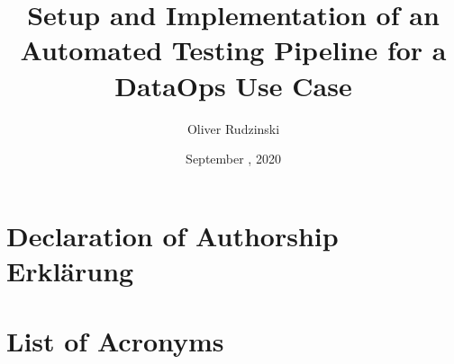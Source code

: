 


\newcommand{\bachelorsthesis}{Setup and Implementation of an\\Automated Testing Pipeline for a\\DataOps Use Case}

\title{\bachelorsthesis} 
\author{Oliver Rudzinski}
\date{September , 2020}



\makeatletter

	
	\pagestyle{plain}
	\clearpage 
	
	\thispagestyle{empty}
	
	\clearpage 
	
	\newpage \clearpage \thispagestyle{empty} \null
	
	\chapter*{Declaration of Authorship\\{\color{gray}Erklärung}}
	
	\thispagestyle{empty}
	
	\clearpage
	
	
	\newpage \clearpage \thispagestyle{empty} \null
	{\small\tableofcontents}
	\newpage \clearpage \thispagestyle{empty} \null
	
	\thispagestyle{empty}
	\chapter*{List of Acronyms} 
	
	
	\listoffigures
	\newpage \clearpage \thispagestyle{empty} \null
	\listoftables
	\newpage \clearpage \thispagestyle{empty} \null
	\listoflistings
	\newpage \clearpage \thispagestyle{empty} \null
	
	\pagestyle{fancy}
